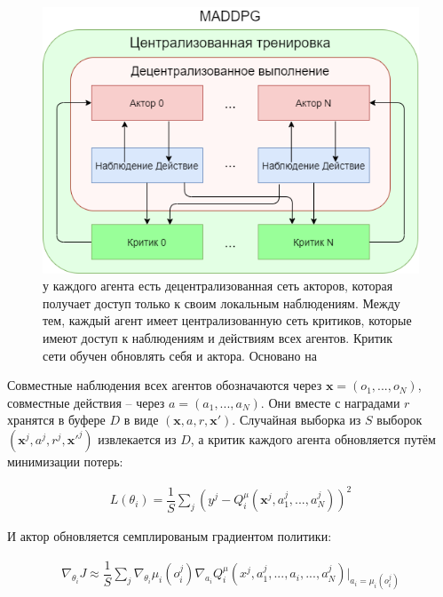 \begin{figure}[ht!]
    \center
    \includegraphics [scale=0.80] {my_folder/images/ch2/maddpg.png}
    \caption{у каждого агента есть децентрализованная сеть акторов, которая получает доступ только к своим локальным наблюдениям. Между тем, каждый агент имеет централизованную сеть критиков, которые имеют доступ к наблюдениям и действиям всех агентов. Критик сети обучен обновлять себя и актора. Основано на \cite{lowe2017multiagent}}
    \label{fig:ch2-maddpg}
\end{figure}

Совместные наблюдения всех агентов обозначаются через $\mathbf{x} = (o_1, ..., o_N)$, совместные действия -- через $a = (a_1, ..., a_N)$. Они вместе с наградами $r$ хранятся в буфере $D$ в виде $(\mathbf{x}, a, r, \mathbf{x}')$. Случайная выборка из $S$ выборок $(\mathbf{x}^j, a^j, r^j, \mathbf{x}'^j)$ извлекается из $D$, а критик каждого агента обновляется путём минимизации потерь:

\begin{equation}
    \begin{multlined}
        L(\theta_i) = \dfrac{1}{S} \sum_j (y^j - Q_{i}^\mu (\mathbf x^j, a_{1}^j, ...,a_{N}^j))^2
    \end{multlined}
\end{equation}

И актор обновляется семплированым градиентом политики:

\begin{equation}
    \begin{multlined}
        \nabla_{\theta_i} J \approx \dfrac{1}{S} \sum_j \nabla_{\theta_i} \mu_i (o^j_i) \nabla_{a_i} Q^\mu_i (x^j, a^j_1, ..., a_i, ..., a^j_N)|_{a_i=\mu_i(o^j_i)}
    \end{multlined}
\end{equation}

